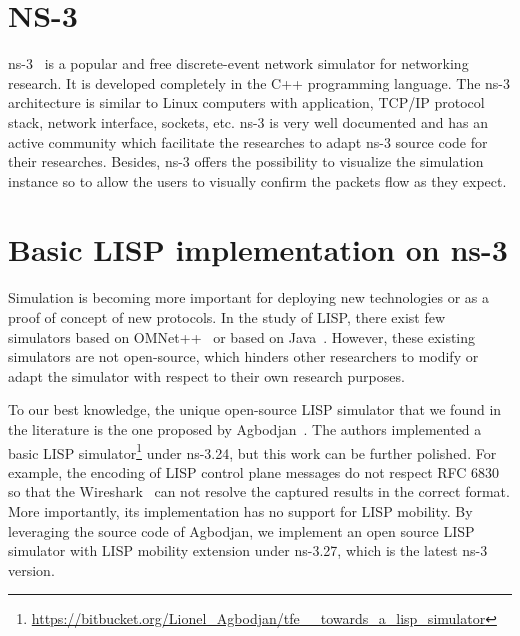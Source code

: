 \section{NS-3}
\label{sec:ns3_ns3}
ns-3~\cite{ns3} is a popular and free discrete-event network simulator for networking research. It is developed completely in the C++ programming language. %
The ns-3 architecture is similar to Linux computers with application, TCP/IP protocol stack, network interface, sockets, etc. ns-3 is very well documented and has an active community which facilitate the researches to adapt ns-3 source code for their researches.  Besides, ns-3 offers the possibility to visualize the simulation instance so to allow the users to visually confirm the packets flow as they expect. 

\section{Basic LISP implementation on ns-3}
\label{sec:ns3_basic_lisp}
Simulation is becoming more important for deploying new technologies or as a proof of concept of new protocols. In the study of LISP, there exist few simulators based on OMNet++~\cite{vesely2015locator, vesely2014multicast, klein2012integration} or based on Java~\cite{stockmayer2016jlisp}. However, these existing simulators are not open-source, which hinders other researchers to modify or adapt the simulator with respect to their own research purposes.

To our best knowledge, the unique open-source LISP simulator that we found in the literature is the one proposed by Agbodjan~\cite{lionel2016}. The authors implemented a basic LISP simulator\footnote{ \url{https://bitbucket.org/Lionel_Agbodjan/tfe__towards_a_lisp_simulator}} under ns-3.24, but this work can be further polished. For example, the encoding of LISP control plane messages do not respect RFC 6830~\cite{rfc6830} so that the Wireshark~\cite{wireshark} can not resolve the captured results in the correct format. %
More importantly, its implementation has no support for LISP mobility. %
By leveraging the source code of Agbodjan, we implement an open source LISP simulator with LISP mobility extension under ns-3.27, which is the latest ns-3 version. 

